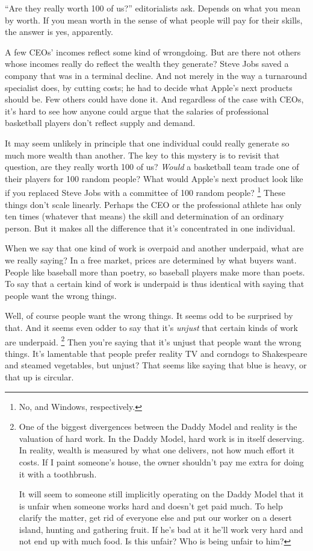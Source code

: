 ``Are they really worth 100 of us?'' editorialists ask. Depends on what
you mean by worth. If you mean worth in the sense of what people will
pay for their skills, the answer is yes, apparently.

A few CEOs' incomes reflect some kind of wrongdoing. But are there not
others whose incomes really do reflect the wealth they generate? Steve
Jobs saved a company that was in a terminal decline. And not merely in
the way a turnaround specialist does, by cutting costs; he had to decide
what Apple's next products should be. Few others could have done it. And
regardless of the case with CEOs, it's hard to see how anyone could
argue that the salaries of professional basketball players don't reflect
supply and demand.

It may seem unlikely in principle that one individual could really
generate so much more wealth than another. The key to this mystery is to
revisit that question, are they really worth 100 of us? \emph{Would} a
basketball team trade one of their players for 100 random people? What
would Apple's next product look like if you replaced Steve Jobs with a
committee of 100 random people? \footnote{No, and Windows, respectively.} These things
don't scale linearly. Perhaps the CEO or the professional athlete has
only ten times (whatever that means) the skill and determination of an
ordinary person. But it makes all the difference that it's concentrated
in one individual.

When we say that one kind of work is overpaid and another underpaid,
what are we really saying? In a free market, prices are determined by
what buyers want. People like baseball more than poetry, so baseball
players make more than poets. To say that a certain kind of work is
underpaid is thus identical with saying that people want the wrong
things.

Well, of course people want the wrong things. It seems odd to be
surprised by that. And it seems even odder to say that it's
\emph{unjust} that certain kinds of work are underpaid.
\footnote{One of the biggest divergences between the Daddy Model and
reality is the valuation of hard work. In the Daddy Model, hard work is
in itself deserving. In reality, wealth is measured by what one
delivers, not how much effort it costs. If I paint someone's house, the
owner shouldn't pay me extra for doing it with a toothbrush.

It will seem to someone still implicitly operating on the Daddy Model
that it is unfair when someone works hard and doesn't get paid much. To
help clarify the matter, get rid of everyone else and put our worker on
a desert island, hunting and gathering fruit. If he's bad at it he'll
work very hard and not end up with much food. Is this unfair? Who is
being unfair to him?} Then you're saying that it's unjust that people
want the wrong things. It's lamentable that people prefer reality TV and
corndogs to Shakespeare and steamed vegetables, but unjust? That seems
like saying that blue is heavy, or that up is circular.

